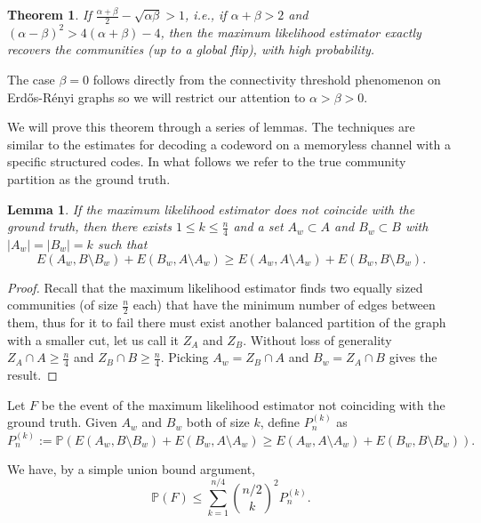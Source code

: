 \documentclass[english]{article}
\newtheorem{lemma}{Lemma}
\newtheorem{theorem}{Theorem}
\newcommand{\1}{\textbf{1}}
\newcommand{\p}{\mathbb{P}}
\begin{document}
\begin{theorem}\label{theorem:main_upperbound_2}
If $\frac{\alpha+\beta}{2} -\sqrt{\alpha \beta} > 1$, i.e., if $\alpha + \beta > 2$ and $(\alpha-\beta)^2 > 4(\alpha+\beta) - 4$, then the maximum likelihood estimator exactly recovers the communities (up to a global flip), with high probability.
\end{theorem}

The case $\beta = 0$ follows directly from the connectivity threshold phenomenon on Erd\H{o}s-R\'enyi graphs so we will restrict our attention to $\alpha> \beta > 0$. 

We will prove this theorem through a series of lemmas. The techniques are similar to the estimates for decoding a codeword on a memoryless channel with a specific structured codes.  In what follows we refer to the true community partition as the ground truth.

\begin{lemma}
If the maximum likelihood estimator does not coincide with the ground truth, then there exists $1\leq k\leq \frac{n}4$ and a set $A_w\subset A$ and $B_w\subset B$ with $|A_w| = |B_w| = k$ such that
\[
E(A_w,B\setminus B_w)+E(B_w,A\setminus A_w) \geq E(A_w,A\setminus A_w)+E(B_w,B\setminus B_w).
\]
\end{lemma}

\begin{proof}
Recall that the maximum likelihood estimator finds two equally sized communities (of size $\frac{n}2$ each) that have the minimum number of edges between them, thus for it to fail there must exist another balanced partition of the graph with a smaller cut, let us call it $Z_A$ and $Z_B$. Without loss of generality $Z_A\cap A \geq \frac{n}4$ and $Z_B \cap B \geq \frac{n}4$. Picking $A_w = Z_B\cap A$ and $B_w = Z_A \cap B$ gives the result.
\end{proof}


Let $F$ be the event of the maximum likelihood estimator not coinciding with the ground truth. Given $A_w$ and $B_w$ both of size $k$, define $P_n^{(k)}$ as
\begin{equation}\label{eq:def:Pnk_1}
P_n^{(k)} := \p\left( E(A_w,B\setminus B_w)+E(B_w,A\setminus A_w) \geq E(A_w,A\setminus A_w)+E(B_w,B\setminus B_w) \right).
\end{equation}

We have, by a simple union bound argument,
\begin{equation}\label{eq:pF_unionbound_ITub}
\p(F) \leq \sum_{k=1}^{n/4} {n/2\choose k}^2 P_n^{(k)}.
\end{equation}
\end{document}
